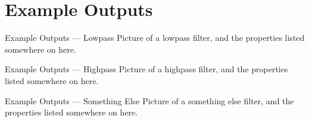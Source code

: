 \documentclass{beamer}
\begin{document}
\section{Example Outputs}
\begin{frame}{Example Outputs --- Lowpass}
  Picture of a lowpass filter, and the properties listed somewhere on here.
\end{frame}
\begin{frame}{Example Outputs --- Highpass}
  Picture of a highpass filter, and the properties listed somewhere on here.
\end{frame}
\begin{frame}{Example Outputs --- Something Else}
  Picture of a something else filter, and the properties listed somewhere on
  here.
\end{frame}
\end{document}
